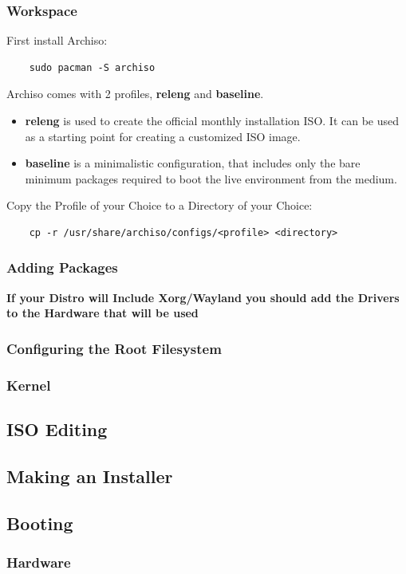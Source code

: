 \documentclass{article}
\begin{document}
\subsubsection{Workspace}
	First install Archiso:
	\begin{lstlisting}
	sudo pacman -S archiso
	\end{lstlisting}
	Archiso comes with 2 profiles, \textbf{releng} and \textbf{baseline}.
	\begin{itemize}
		\item \textbf{releng} is used to create the official monthly installation ISO. It can be used as a starting point for creating a customized ISO image.
    	\item \textbf{baseline} is a minimalistic configuration, that includes only the bare minimum packages required to boot the live environment from the medium.
	\end{itemize}
	Copy the Profile of your Choice to a Directory of your Choice:
	\begin{lstlisting}
	cp -r /usr/share/archiso/configs/<profile> <directory>
	\end{lstlisting}
\subsubsection{Adding Packages}
\textbf{If your Distro will Include Xorg/Wayland you should add the Drivers to the Hardware that will be used}
\subsubsection{Configuring the Root Filesystem}
\subsubsection{Kernel}
\subsection{ISO Editing}
\subsection{Making an Installer}
\subsection{Booting}
\subsubsection{Hardware}
\end{document}
